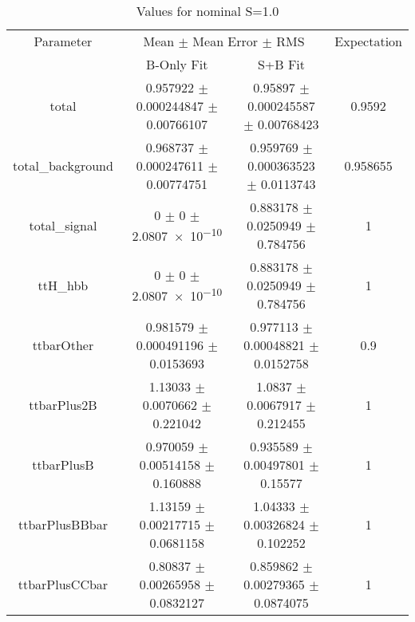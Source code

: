 \begin{table}
\centering
\caption{Values for nominal S=1.0}
\begin{tabular}{cccc}
\toprule
Parameter & \multicolumn{2}{c}{Mean $\pm$ Mean Error $\pm$ RMS} & Expectation\\
 & B-Only Fit & S+B Fit & \\
\midrule
total & \num{0.957922} $\pm$ \num{0.000244847} $\pm$ \num{0.00766107} & \num{0.95897} $\pm$ \num{0.000245587} $\pm$ \num{0.00768423} & \num{0.9592}\\
total\_background & \num{0.968737} $\pm$ \num{0.000247611} $\pm$ \num{0.00774751} & \num{0.959769} $\pm$ \num{0.000363523} $\pm$ \num{0.0113743} & \num{0.958655}\\
total\_signal & \num{0} $\pm$ \num{0} $\pm$ \num{2.0807e-10} & \num{0.883178} $\pm$ \num{0.0250949} $\pm$ \num{0.784756} & \num{1}\\
ttH\_hbb & \num{0} $\pm$ \num{0} $\pm$ \num{2.0807e-10} & \num{0.883178} $\pm$ \num{0.0250949} $\pm$ \num{0.784756} & \num{1}\\
ttbarOther & \num{0.981579} $\pm$ \num{0.000491196} $\pm$ \num{0.0153693} & \num{0.977113} $\pm$ \num{0.00048821} $\pm$ \num{0.0152758} & \num{0.9}\\
ttbarPlus2B & \num{1.13033} $\pm$ \num{0.0070662} $\pm$ \num{0.221042} & \num{1.0837} $\pm$ \num{0.0067917} $\pm$ \num{0.212455} & \num{1}\\
ttbarPlusB & \num{0.970059} $\pm$ \num{0.00514158} $\pm$ \num{0.160888} & \num{0.935589} $\pm$ \num{0.00497801} $\pm$ \num{0.15577} & \num{1}\\
ttbarPlusBBbar & \num{1.13159} $\pm$ \num{0.00217715} $\pm$ \num{0.0681158} & \num{1.04333} $\pm$ \num{0.00326824} $\pm$ \num{0.102252} & \num{1}\\
ttbarPlusCCbar & \num{0.80837} $\pm$ \num{0.00265958} $\pm$ \num{0.0832127} & \num{0.859862} $\pm$ \num{0.00279365} $\pm$ \num{0.0874075} & \num{1}\\
\bottomrule
\end{tabular}
\end{table}